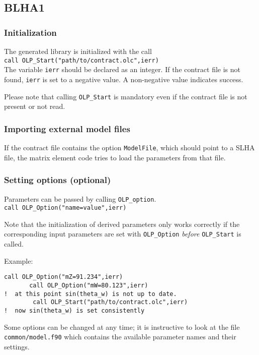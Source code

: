 \subsection{BLHA1}

\subsubsection{Initialization}
The generated \gosam{} library is initialized with the call\\
{\tt        call OLP\_Start("path/to/contract.olc",ierr)}\\
The variable \texttt{ierr} should be declared as an integer. If the contract
file is not found, \texttt{ierr} is set to a negative value. A non-negative
value indicates success.

Please note that calling \texttt{OLP\_Start} is mandatory even if the contract
file is not present or not read.

\subsubsection{Importing external model files}
If the contract file contains the option
\texttt{ModelFile}, which should point to a SLHA file,
the matrix element code tries to load the parameters from that file.

\subsubsection{Setting options (optional)}
Parameters can be passed by calling \texttt{OLP\_option}.\\
{\tt        call OLP\_Option("name=value",ierr)}

Note that the initialization of derived parameters only works correctly
if the corresponding input parameters are set with \texttt{OLP\_Option}
\emph{before} \texttt{OLP\_Start} is called.

Example:
\begin{lstlisting}[columns=flexibel]
       call OLP_Option("mZ=91.234",ierr)
       call OLP_Option("mW=80.123",ierr)
!  at this point sin(theta_w) is not up to date.
        call OLP_Start("path/to/contract.olc",ierr)
!  now sin(theta_w) is set consistently
\end{lstlisting}

Some options can be changed at any time; it is instructive to 
look at the file
\texttt{common/model.f90} which contains  the available
parameter names and  their settings.

